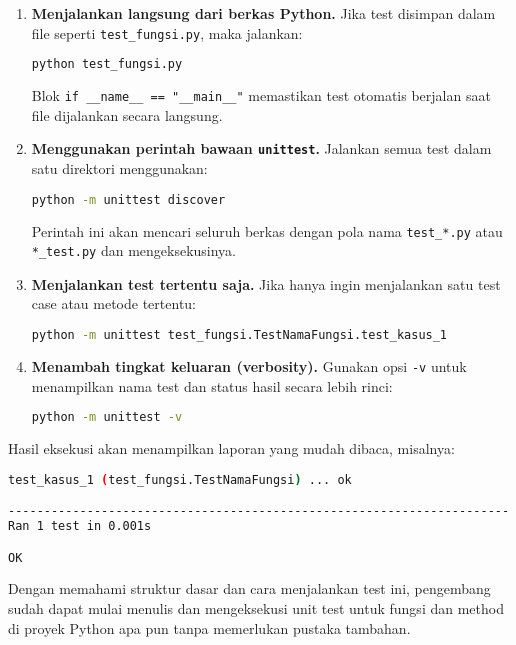 \begin{enumerate}
    \item \textbf{Menjalankan langsung dari berkas Python.}  
    Jika test disimpan dalam file seperti \texttt{test\_fungsi.py}, maka jalankan:
    \begin{lstlisting}[language=bash]
    python test_fungsi.py
    \end{lstlisting}
    Blok \texttt{if \_\_name\_\_ == "\_\_main\_\_"} memastikan test otomatis berjalan saat file dijalankan secara langsung.

    \item \textbf{Menggunakan perintah bawaan \texttt{unittest}.}  
    Jalankan semua test dalam satu direktori menggunakan:
    \begin{lstlisting}[language=bash]
    python -m unittest discover
    \end{lstlisting}
    Perintah ini akan mencari seluruh berkas dengan pola nama \texttt{test\_*.py} atau \texttt{*\_test.py} dan mengeksekusinya.

    \item \textbf{Menjalankan test tertentu saja.}  
    Jika hanya ingin menjalankan satu test case atau metode tertentu:
    \begin{lstlisting}[language=bash]
    python -m unittest test_fungsi.TestNamaFungsi.test_kasus_1
    \end{lstlisting}

    \item \textbf{Menambah tingkat keluaran (verbosity).}  
    Gunakan opsi \texttt{-v} untuk menampilkan nama test dan status hasil secara lebih rinci:
    \begin{lstlisting}[language=bash]
    python -m unittest -v
    \end{lstlisting}
\end{enumerate}

Hasil eksekusi akan menampilkan laporan yang mudah dibaca, misalnya:

\begin{lstlisting}[language=bash]
test_kasus_1 (test_fungsi.TestNamaFungsi) ... ok

----------------------------------------------------------------------
Ran 1 test in 0.001s

OK
\end{lstlisting}

Dengan memahami struktur dasar dan cara menjalankan test ini, pengembang sudah dapat mulai menulis dan mengeksekusi unit test untuk fungsi dan method di proyek Python apa pun tanpa memerlukan pustaka tambahan.


